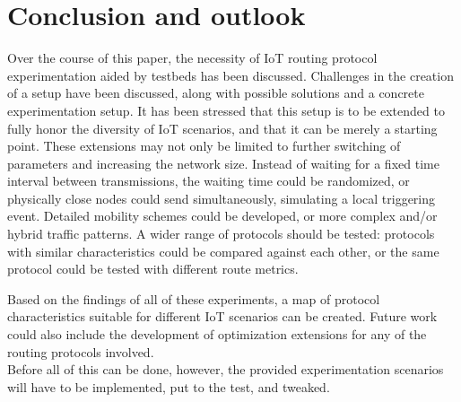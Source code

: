 \documentclass{acm_proc_article-sp}
\begin{document}
\section{Conclusion and outlook}
\label{sec:Conclusion}
Over the course of this paper, the necessity of IoT routing protocol experimentation aided by testbeds has been discussed. Challenges in the creation of a setup have been discussed, along with possible solutions and a concrete experimentation setup. It has been stressed that this setup is to be extended to fully honor the diversity of IoT scenarios, and that it can be merely a starting point. These extensions may not only be limited to further switching of parameters and increasing the network size. Instead of waiting for a fixed time interval between transmissions, the waiting time could be randomized, or physically close nodes could send simultaneously, simulating a local triggering event. Detailed mobility schemes could be developed, or more complex and/or hybrid traffic patterns. A wider range of protocols should be tested: protocols with similar characteristics could be compared against each other, or the same protocol could be tested with different route metrics.

Based on the findings of all of these experiments, a map of protocol characteristics suitable for different IoT scenarios can be created. Future work could also include the development of optimization extensions for any of the routing protocols involved.\\
Before all of this can be done, however, the provided experimentation scenarios will have to be implemented, put to the test, and tweaked.



\end{document}
